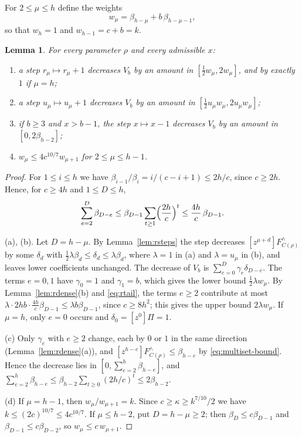 \documentclass[11pt]{amsart}
\newtheorem{lemma}[theorem]{Lemma}
\theoremstyle{definition}
\theoremstyle{remark}
\numberwithin{equation}{section}
\newcommand{\Fr}{F^{\wedge}}
\newcommand{\coef}[1]{[z^{#1}]}
\begin{document}
For $2\le\mu\le h$ define the weights
\[
w_\mu=\beta_{h-\mu}+b\,\beta_{h-\mu-1},
\]
so that $w_h=1$ and $w_{h-1}=c+b=k$.

\begin{lemma}\label{lem:rweights}
For every parameter $\rho$ and every admissible $x$:
\begin{enumerate}[label=\textup{(\alph*)}]
\item a step $r_\mu\mapsto r_\mu+1$ decreases $V_b$ by an amount in $[\tfrac12w_\mu,2w_\mu]$, and by exactly $1$ if $\mu=h$;
\item a step $u_\mu\mapsto u_\mu+1$ decreases $V_b$ by an amount in $[\tfrac12u_\mu w_\mu,2u_\mu w_\mu]$;
\item if $b\ge 3$ and $x>b-1$, the step $x\mapsto x-1$ decreases $V_b$ by an amount in $[0,2\beta_{h-2}]$;
\item $w_\mu\le 4c^{10/7}w_{\mu+1}$ for $2\le\mu\le h-1$.
\end{enumerate}
\end{lemma}

\begin{proof}
For $1\le i\le h$ we have $\beta_{i-1}/\beta_i=i/(c-i+1)\le 2h/c$, since $c\ge 2h$. Hence, for $c\ge 4h$ and $1\le D\le h$,
\begin{equation}\label{eq:rtail}
\sum_{e=2}^{D}\beta_{D-e}\le\beta_{D-1}\sum_{t\ge1}\Bigl(\frac{2h}c\Bigr)^t\le\frac{4h}c\,\beta_{D-1}.
\end{equation}

(a), (b). Let $D=h-\mu$. By Lemma~\ref{lem:rsteps} the step decreases $\coef{\mu+d}\Fr_{C(\rho)}$ by some $\delta_d$ with $\frac12\lambda\beta_d\le\delta_d\le\lambda\beta_d$, where $\lambda=1$ in (a) and $\lambda=u_\mu$ in (b), and leaves lower coefficients unchanged. The decrease of $V_b$ is $\sum_{e=0}^{D}\gamma_e\delta_{D-e}$. The terms $e=0,1$ have $\gamma_0=1$ and $\gamma_1=b$, which gives the lower bound $\frac12\lambda w_\mu$. By Lemma~\ref{lem:rdense}(b) and \eqref{eq:rtail}, the terms $e\ge 2$ contribute at most $\lambda\cdot 2hb\cdot\frac{4h}{c}\beta_{D-1}\le\lambda b\beta_{D-1}$, since $c\ge 8h^2$; this gives the upper bound $2\lambda w_\mu$. If $\mu=h$, only $e=0$ occurs and $\delta_0=\coef0\Pi=1$.

(c) Only $\gamma_e$ with $e\ge 2$ change, each by $0$ or $1$ in the same direction (Lemma~\ref{lem:rdense}(a)), and $\coef{h-e}\Fr_{C(\rho)}\le\beta_{h-e}$ by \eqref{eq:multiset-bound}. Hence the decrease lies in $[0,\sum_{e=2}^h\beta_{h-e}]$, and $\sum_{e=2}^h\beta_{h-e}\le\beta_{h-2}\sum_{t\ge0}(2h/c)^t\le 2\beta_{h-2}$.

(d) If $\mu=h-1$, then $w_\mu/w_{\mu+1}=k$. Since $c\ge\kappa\ge k^{7/10}/2$ we have $k\le(2c)^{10/7}\le 4c^{10/7}$. If $\mu\le h-2$, put $D=h-\mu\ge 2$; then $\beta_D\le c\beta_{D-1}$ and $\beta_{D-1}\le c\beta_{D-2}$, so $w_\mu\le c\,w_{\mu+1}$.
\end{proof}
\end{document}
